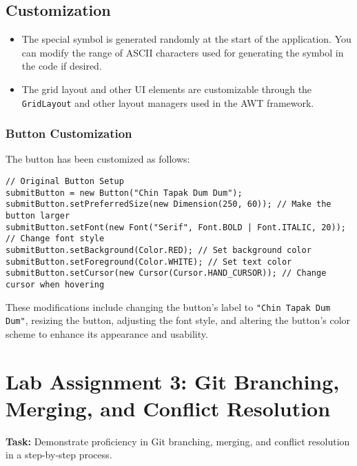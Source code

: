 \documentclass[a4paper,12pt]{article}
\begin{document}
\subsection{Customization}
\begin{itemize}
    \item The special symbol is generated randomly at the start of the application. You can modify the range of ASCII characters used for generating the symbol in the code if desired.
    \item The grid layout and other UI elements are customizable through the \texttt{GridLayout} and other layout managers used in the AWT framework.
\end{itemize}

\subsubsection{Button Customization}
The button has been customized as follows:

\begin{verbatim}
// Original Button Setup
submitButton = new Button("Chin Tapak Dum Dum");
submitButton.setPreferredSize(new Dimension(250, 60)); // Make the button larger
submitButton.setFont(new Font("Serif", Font.BOLD | Font.ITALIC, 20)); // Change font style
submitButton.setBackground(Color.RED); // Set background color
submitButton.setForeground(Color.WHITE); // Set text color
submitButton.setCursor(new Cursor(Cursor.HAND_CURSOR)); // Change cursor when hovering
\end{verbatim}

These modifications include changing the button's label to \texttt{"Chin Tapak Dum Dum"}, resizing the button, adjusting the font style, and altering the button's color scheme to enhance its appearance and usability.

\section{Lab Assignment 3: Git Branching, Merging, and Conflict Resolution}

\textbf{Task:} Demonstrate proficiency in Git branching, merging, and conflict resolution in a step-by-step process.
\end{document}
